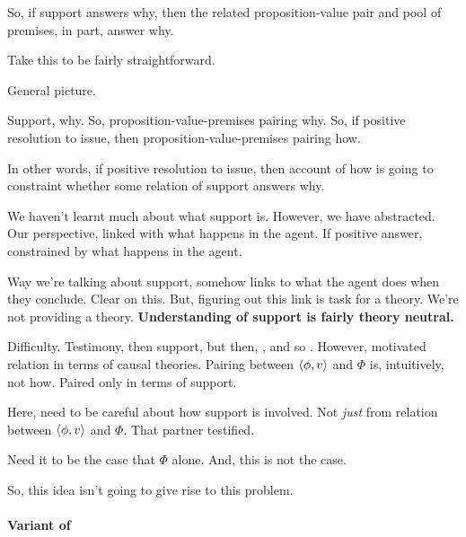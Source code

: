 \begin{note}
  So, if support answers why, then the related proposition-value pair and pool of premises, in part, answer why.

  Take this to be fairly straightforward.
\end{note}

\begin{note}
  General picture.

  Support, why.
  So, proposition-value-premises pairing why.
  So, if positive resolution to issue, then proposition-value-premises pairing how.

  In other words, if positive resolution to issue, then account of how is going to constraint whether some relation of support answers why.

  We haven't learnt much about what support is.
  However, we have abstracted.
  Our perspective, linked with what happens in the agent.
  If positive answer, constrained by what happens in the agent.

  Way we're talking about support, somehow links to what the agent does when they conclude.
  Clear on this.
  But, figuring out this link is task for a theory.
  We're not providing a theory.
  \textbf{Understanding of support is fairly theory neutral.}
\end{note}

\begin{note}
  Difficulty.
  Testimony, then support, but then, \qWhy{}, and so \qHow{}.
  However, motivated relation in terms of causal theories.
  Pairing between \(\langle \phi, v \rangle\) and \(\Phi\) is, intuitively, not how.
  Paired only in terms of support.

  Here, need to be careful about how support is involved.
  Not \emph{just} from relation between \(\langle \phi, v \rangle\) and \(\Phi\).
  That partner testified.

  Need it to be the case that \(\Phi\) alone.
  And, this is not the case.

  So, this idea isn't going to give rise to this problem.
\end{note}

\paragraph{Variant of \qWhy{}}
\label{sec:clar:expand:qWhy:variant}

